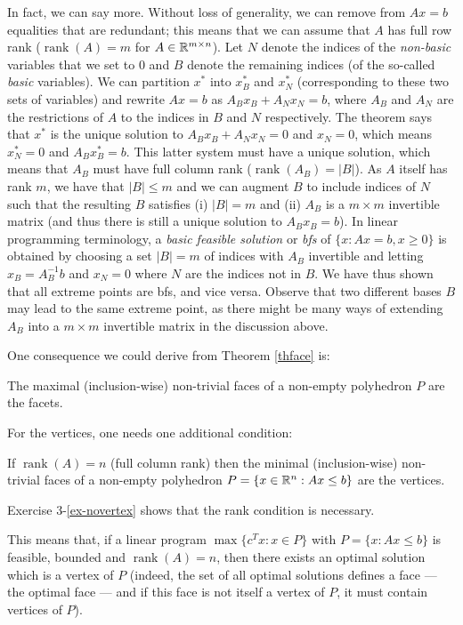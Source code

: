 \documentclass[12pt]{article}
\newcommand{\rank}{\operatorname{rank}}
\begin{document}
In fact, we can say more. Without loss of
generality, we can remove from $Ax=b$ equalities that are redundant;
this means that we can assume that $A$ has full row rank ($\rank(A)=m$
for $A\in {\mathbb R}^{m\times n}$). Let $N$ denote the
indices of the {\it non-basic} variables that we set to 0 and $B$
denote the remaining indices (of the so-called {\it basic} variables).
We can partition $x^*$ into $x^*_B$ and $x_N^*$ (corresponding to
these two sets of variables) and rewrite $Ax=b$ as $A_Bx_B+A_Nx_N=b$,
where $A_B$ and $A_N$ are the restrictions of $A$ to the indices in
$B$ and $N$ respectively. The theorem says that $x^*$ is the unique
solution to $A_Bx_B+A_Nx_N=0$ and $x_N=0$, which means $x^*_N=0$ and
$A_Bx_B^*=b$. This latter system must have a unique solution, which
means that $A_B$ must have full column rank ($\rank(A_B)=|B|$). As $A$
itself has rank $m$, we have that $|B|\leq m$ and we can augment $B$
to include indices of $N$ such that the resulting $B$ satisfies (i)
$|B|=m$ and (ii) $A_B$ is a $m\times m$ invertible matrix (and thus
there is still a unique solution to $A_Bx_B=b$). In linear programming
terminology, a {\it basic feasible solution} or {\it bfs} of $\{x:
Ax=b, x\geq 0\}$ is obtained by choosing a set $|B|=m$ of indices with
$A_B$ invertible and letting $x_B=A_B^{-1} b$ and $x_N=0$ where $N$
are the indices not in $B$. We have thus shown that all extreme points are bfs, and vice versa. Observe that 
 two different bases $B$ may lead to the same extreme point,
as there might be many ways of extending $A_B$ into a $m\times m$
invertible matrix in the discussion above.

One consequence we could derive from Theorem \ref{thface} is:
\begin{corollary} \label{corfacets}
The maximal (inclusion-wise) non-trivial faces of a non-empty
polyhedron $P$ are the facets.
\end{corollary}
For the vertices, one needs one additional condition:
\begin{corollary} \label{corvertices}
If $\rank(A)=n$ (full column rank) then the minimal (inclusion-wise)
non-trivial faces of a non-empty polyhedron $P=\{x\in {\mathbb R}^n: Ax\leq
b\}$ are the vertices.
\end{corollary}
Exercise 3-\ref{ex-novertex} shows that the rank condition is necessary. 

This means that, if a linear program $\max\{c^Tx: x\in P\}$ with
$P=\{x: Ax\leq b\}$ is feasible, bounded and $\rank(A)=n$, then there
exists an optimal solution which is a vertex of $P$ (indeed, the set
of all optimal solutions defines a face --- the optimal face --- and if
this face is not itself a vertex of $P$, it must contain vertices of
$P$).
\end{document}
